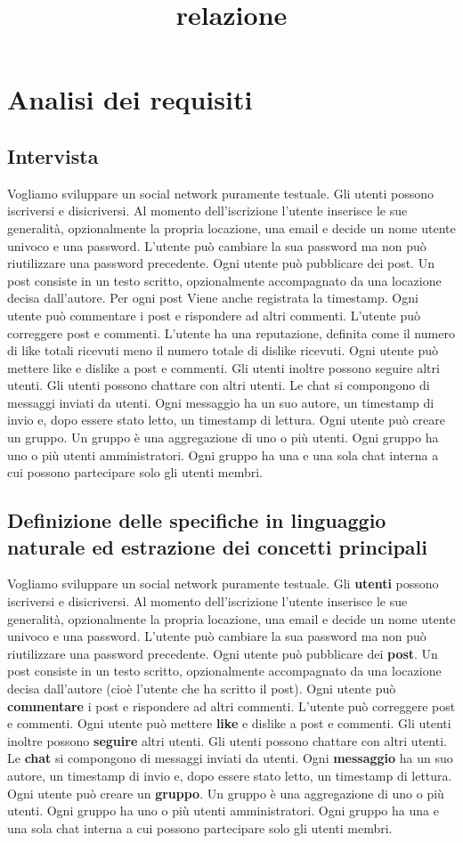 \documentclass[a4paper,12pt]{report}
\begin{document}
\title{relazione}

\chapter{Analisi dei requisiti}
\section{Intervista}
Vogliamo sviluppare un social network puramente testuale.
Gli utenti possono iscriversi e disicriversi. Al momento dell'iscrizione l'utente inserisce le sue generalità, opzionalmente la propria locazione, una email e decide un nome utente univoco e una password.
L'utente può cambiare la sua password ma non può riutilizzare una password precedente.
Ogni utente può pubblicare dei post. Un post consiste in un testo scritto, opzionalmente accompagnato da una locazione decisa dall'autore. 
Per ogni post Viene anche registrata la timestamp.
Ogni utente può commentare i post e rispondere ad altri commenti.
L'utente può correggere post e commenti.
L'utente ha una reputazione, definita come il numero di like totali ricevuti meno il numero totale di dislike ricevuti.
Ogni utente può mettere like e dislike a post e commenti.
Gli utenti inoltre possono seguire altri utenti.
Gli utenti possono chattare con altri utenti. Le chat si compongono di messaggi inviati da utenti. Ogni messaggio ha un suo autore, un timestamp di invio e, dopo essere stato letto, un timestamp di lettura.
Ogni utente può creare un gruppo. Un gruppo è una aggregazione di uno o più utenti. Ogni gruppo ha uno o più utenti amministratori.
Ogni gruppo ha una e una sola chat interna a cui possono partecipare solo gli utenti membri.
\section{Definizione delle specifiche in linguaggio naturale ed estrazione dei concetti principali}
Vogliamo sviluppare un social network puramente testuale.
Gli \textbf{utenti} possono iscriversi e disicriversi. Al momento dell'iscrizione l'utente inserisce le sue generalità, opzionalmente la propria locazione, una email e decide un nome utente univoco e una password.
L'utente può cambiare la sua password ma non può riutilizzare una password precedente.
Ogni utente può pubblicare dei \textbf{post}. Un post consiste in un testo scritto, opzionalmente accompagnato da una locazione decisa dall'autore (cioè l'utente che ha scritto il post).
Ogni utente può \textbf{commentare} i post e rispondere ad altri commenti.
L'utente può correggere post e commenti.
Ogni utente può mettere \textbf{like} e dislike a post e commenti.
Gli utenti inoltre possono \textbf{seguire} altri utenti.
Gli utenti possono chattare con altri utenti. Le \textbf{chat} si compongono di messaggi inviati da utenti. Ogni \textbf{messaggio} ha un suo autore, un timestamp di invio e, dopo essere stato letto, un timestamp di lettura.
Ogni utente può creare un \textbf{gruppo}. Un gruppo è una aggregazione di uno o più utenti. Ogni gruppo ha uno o più utenti amministratori.
Ogni gruppo ha una e una sola chat interna a cui possono partecipare solo gli utenti membri.
\end{document}
